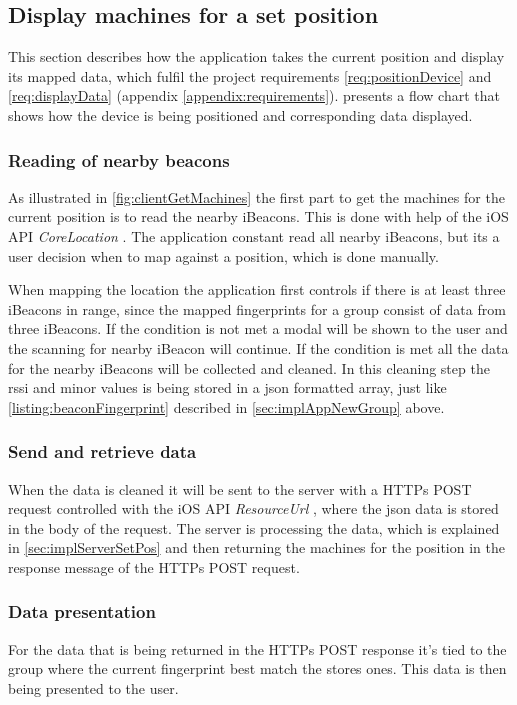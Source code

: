 \subsection{Display machines for a set position}\label{sec:implAppSetPos}
This section describes how the application takes the current position and display its mapped data, which fulfil the project requirements \ref{req:positionDevice} and \ref{req:displayData} (appendix \ref{appendix:requirements}).
 presents a flow chart that shows how the device is being positioned and corresponding data displayed.



\subsubsection{Reading of nearby beacons}\label{sec:implAppSetPosReadBeacons}
As illustrated in \cref{fig:clientGetMachines} the first part to get the machines for the current position is to read the nearby iBeacons.
This is done with help of the iOS API \textit{CoreLocation} \cite{CoreLocationApple}.
The application constant read all nearby iBeacons, but its a user decision when to map against a position, which is done manually.

\bigskip

When mapping the location the application first controls if there is at least three iBeacons in range, since the mapped fingerprints for a group consist of data from three iBeacons.
If the condition is not met a modal will be shown to the user and the scanning for nearby iBeacon will continue.
If the condition is met all the data for the nearby iBeacons will be collected and cleaned.
In this cleaning step the \acrshort{rssi} and minor values is being stored in a \acrshort{json} formatted array, just like \cref{listing:beaconFingerprint} described in \cref{sec:implAppNewGroup} above.


\subsubsection{Send and retrieve data}\label{sec:implAppSetPosSendRetreiveData}
When the data is cleaned it will be sent to the server with a HTTPs POST request controlled with the iOS API \textit{ResourceUrl} \cite{ResourceURLAppleDeveloper}, where the \acrshort{json} data is stored in the body of the request.
The server is processing the data, which is explained in \cref{sec:implServerSetPos} and then returning the machines for the position in the response message of the HTTPs POST request.


\subsubsection{Data presentation}\label{sec:implAppSetPosShowData}
For the data that is being returned in the HTTPs POST response it's tied to the group where the current fingerprint best match the stores ones.
This data is then being presented to the user.
